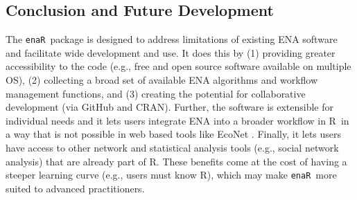 \documentclass[11pt]{article}
\newcommand{\R}{R}
\newcommand{\enaR}{\texttt{enaR}}
\begin{document}
\begin{spacing}{2}
\section{Conclusion and Future Development}

The \enaR\ package is designed to address limitations of existing ENA
software and facilitate wide development and use. It does this by (1)
providing greater accessibility to the code (e.g., free and open
source software available on multiple OS), (2) collecting a broad set
of available ENA algorithms and workflow management functions, and (3)
creating the potential for collaborative development (via GitHub and
CRAN).  Further, the software is extensible for individual needs and
it lets users integrate ENA into a broader workflow in \R\ in a way
that is not possible in web based tools like EcoNet
\citep{kazanci07,schramski11}.  Finally, it lets users have access to
other network and statistical analysis tools (e.g., social network
analysis) that are already part of \R.  These benefits come at the
cost of having a steeper learning curve (e.g., users must know \R ),
which may make \enaR\ more suited to advanced practitioners.


\end{spacing}
\end{document}
